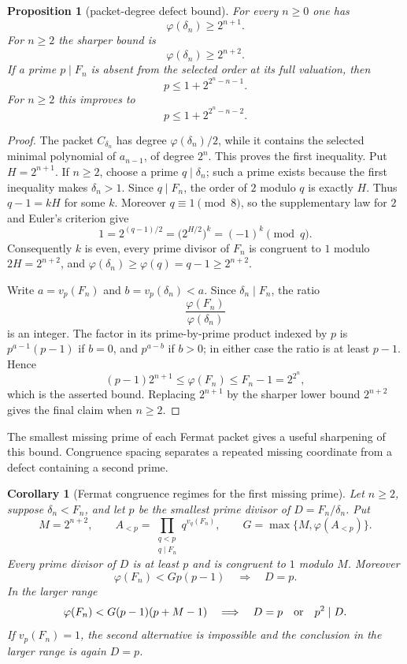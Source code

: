 \documentclass[11pt]{article}
\newtheorem{proposition}[theorem]{Proposition}
\newtheorem{corollary}[theorem]{Corollary}
\theoremstyle{definition}
\theoremstyle{remark}
\begin{document}
\begin{proposition}[packet-degree defect bound]
\label{prop:z-packet-degree}
For every $n\geq0$ one has
\[
 \varphi(\delta_n)\geq2^{n+1}.
\]
For $n\geq2$ the sharper bound is
\[
 \varphi(\delta_n)\geq2^{n+2}.
\]
If a prime $p\mid F_n$ is absent from the selected order at its full
valuation, then
\[
 p\leq1+2^{2^n-n-1}.
\]
For $n\geq2$ this improves to
\[
 p\leq1+2^{2^n-n-2}.
\]
\end{proposition}

\begin{proof}
The packet $C_{\delta_n}$ has degree $\varphi(\delta_n)/2$, while it
contains the selected minimal polynomial of $a_{n-1}$, of degree $2^n$.
This proves the first inequality.  Put $H=2^{n+1}$.  If $n\geq2$, choose a
prime $q\mid\delta_n$; such a prime exists because the first inequality
makes $\delta_n>1$.  Since $q\mid F_n$, the order of $2$ modulo $q$ is
exactly $H$.  Thus $q-1=kH$ for some $k$.  Moreover $q\equiv1\pmod8$, so
the supplementary law for $2$ and Euler's criterion give
\[
 1=2^{(q-1)/2}=\bigl(2^{H/2}\bigr)^k=(-1)^k\pmod q.
\]
Consequently $k$ is even, every prime divisor of $F_n$ is congruent to
$1$ modulo $2H=2^{n+2}$, and
$\varphi(\delta_n)\geq\varphi(q)=q-1\geq2^{n+2}$.

Write
$a=v_p(F_n)$ and $b=v_p(\delta_n)<a$.  Since $\delta_n\mid F_n$, the ratio
\[
 \frac{\varphi(F_n)}{\varphi(\delta_n)}
\]
is an integer.  The factor in its prime-by-prime product indexed by $p$ is
$p^{a-1}(p-1)$ if $b=0$, and $p^{a-b}$ if $b>0$; in either case the ratio is
at least $p-1$.  Hence
\[
 (p-1)2^{n+1}
 \leq\varphi(F_n)
 \leq F_n-1=2^{2^n},
\]
which is the asserted bound.
Replacing $2^{n+1}$ by the sharper lower bound $2^{n+2}$ gives the final
claim when $n\geq2$.
\end{proof}

The smallest missing prime of each Fermat packet gives a useful sharpening
of this bound.  Congruence spacing separates a repeated missing coordinate
from a defect containing a second prime.

\begin{corollary}[Fermat congruence regimes for the first missing prime]
\label{cor:z-one-packet}
Let $n\geq2$, suppose $\delta_n<F_n$, and let $p$ be the smallest prime
divisor of $D=F_n/\delta_n$.  Put
\[
 M=2^{n+2},
 \qquad
 A_{<p}=\prod_{\substack{q<p\\q\mid F_n}}q^{v_q(F_n)},
 \qquad G=\max\{M,\varphi(A_{<p})\}.
\]
Every prime divisor of $D$ is at least $p$ and is congruent to $1$ modulo
$M$.  Moreover
\[
 \varphi(F_n)<G p(p-1)
 \quad\Longrightarrow\quad
 D=p.
\]
In the larger range
\[
 \varphi(F_n)<G(p-1)(p+M-1)
 \quad\Longrightarrow\quad
 D=p\quad\hbox{or}\quad p^2\mid D.
\]
If $v_p(F_n)=1$, the second alternative is impossible and the conclusion
in the larger range is again $D=p$.
\end{corollary}
\end{document}
